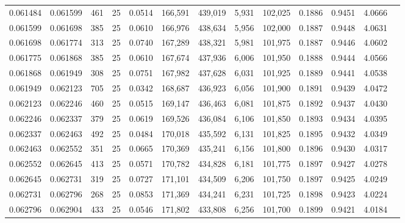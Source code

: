 \begin{tabular}{rrrrrrrrrrrrr}
0.061484 & 0.061599 &   461 &  25 &                                     0.0514 & 166,591 & 439,019 &   5,931 & 102,025 & 0.1886 & 0.9451 & 4.0666 \\
0.061599 & 0.061698 &   385 &  25 &                                     0.0610 & 166,976 & 438,634 &   5,956 & 102,000 & 0.1887 & 0.9448 & 4.0631 \\
0.061698 & 0.061774 &   313 &  25 &                                     0.0740 & 167,289 & 438,321 &   5,981 & 101,975 & 0.1887 & 0.9446 & 4.0602 \\
0.061775 & 0.061868 &   385 &  25 &                                     0.0610 & 167,674 & 437,936 &   6,006 & 101,950 & 0.1888 & 0.9444 & 4.0566 \\
0.061868 & 0.061949 &   308 &  25 &                                     0.0751 & 167,982 & 437,628 &   6,031 & 101,925 & 0.1889 & 0.9441 & 4.0538 \\
0.061949 & 0.062123 &   705 &  25 &                                     0.0342 & 168,687 & 436,923 &   6,056 & 101,900 & 0.1891 & 0.9439 & 4.0472 \\
0.062123 & 0.062246 &   460 &  25 &                                     0.0515 & 169,147 & 436,463 &   6,081 & 101,875 & 0.1892 & 0.9437 & 4.0430 \\
0.062246 & 0.062337 &   379 &  25 &                                     0.0619 & 169,526 & 436,084 &   6,106 & 101,850 & 0.1893 & 0.9434 & 4.0395 \\
0.062337 & 0.062463 &   492 &  25 &                                     0.0484 & 170,018 & 435,592 &   6,131 & 101,825 & 0.1895 & 0.9432 & 4.0349 \\
0.062463 & 0.062552 &   351 &  25 &                                     0.0665 & 170,369 & 435,241 &   6,156 & 101,800 & 0.1896 & 0.9430 & 4.0317 \\
0.062552 & 0.062645 &   413 &  25 &                                     0.0571 & 170,782 & 434,828 &   6,181 & 101,775 & 0.1897 & 0.9427 & 4.0278 \\
0.062645 & 0.062731 &   319 &  25 &                                     0.0727 & 171,101 & 434,509 &   6,206 & 101,750 & 0.1897 & 0.9425 & 4.0249 \\
0.062731 & 0.062796 &   268 &  25 &                                     0.0853 & 171,369 & 434,241 &   6,231 & 101,725 & 0.1898 & 0.9423 & 4.0224 \\
0.062796 & 0.062904 &   433 &  25 &                                     0.0546 & 171,802 & 433,808 &   6,256 & 101,700 & 0.1899 & 0.9421 & 4.0184 \\

\end{tabular}
